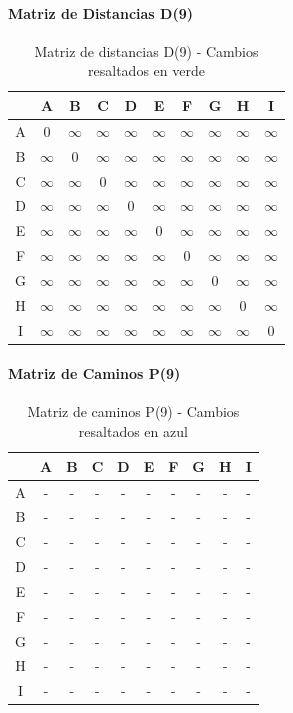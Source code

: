 \documentclass[12pt]{article}
\begin{document}
\paragraph{Matriz de Distancias D(9)}
\begin{table}[h!]
\centering
\begin{tabular}{|c|c|c|c|c|c|c|c|c|c|}
\hline
 & A & B & C & D & E & F & G & H & I \\\hline
A & 0 & $\infty$ & $\infty$ & $\infty$ & $\infty$ & $\infty$ & $\infty$ & $\infty$ & $\infty$ \\\hline
B & $\infty$ & 0 & $\infty$ & $\infty$ & $\infty$ & $\infty$ & $\infty$ & $\infty$ & $\infty$ \\\hline
C & $\infty$ & $\infty$ & 0 & $\infty$ & $\infty$ & $\infty$ & $\infty$ & $\infty$ & $\infty$ \\\hline
D & $\infty$ & $\infty$ & $\infty$ & 0 & $\infty$ & $\infty$ & $\infty$ & $\infty$ & $\infty$ \\\hline
E & $\infty$ & $\infty$ & $\infty$ & $\infty$ & 0 & $\infty$ & $\infty$ & $\infty$ & $\infty$ \\\hline
F & $\infty$ & $\infty$ & $\infty$ & $\infty$ & $\infty$ & 0 & $\infty$ & $\infty$ & $\infty$ \\\hline
G & $\infty$ & $\infty$ & $\infty$ & $\infty$ & $\infty$ & $\infty$ & 0 & $\infty$ & $\infty$ \\\hline
H & $\infty$ & $\infty$ & $\infty$ & $\infty$ & $\infty$ & $\infty$ & $\infty$ & 0 & $\infty$ \\\hline
I & $\infty$ & $\infty$ & $\infty$ & $\infty$ & $\infty$ & $\infty$ & $\infty$ & $\infty$ & 0 \\\hline
\end{tabular}
\caption{Matriz de distancias D(9) - Cambios resaltados en verde}
\end{table}

\paragraph{Matriz de Caminos P(9)}
\begin{table}[h!]
\centering
\begin{tabular}{|c|c|c|c|c|c|c|c|c|c|}
\hline
 & A & B & C & D & E & F & G & H & I \\\hline
A & - & - & - & - & - & - & - & - & - \\\hline
B & - & - & - & - & - & - & - & - & - \\\hline
C & - & - & - & - & - & - & - & - & - \\\hline
D & - & - & - & - & - & - & - & - & - \\\hline
E & - & - & - & - & - & - & - & - & - \\\hline
F & - & - & - & - & - & - & - & - & - \\\hline
G & - & - & - & - & - & - & - & - & - \\\hline
H & - & - & - & - & - & - & - & - & - \\\hline
I & - & - & - & - & - & - & - & - & - \\\hline
\end{tabular}
\caption{Matriz de caminos P(9) - Cambios resaltados en azul}
\end{table}
\end{document}
